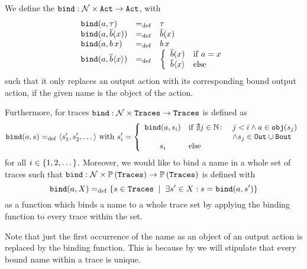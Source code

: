 \begin{definition}[Binding]
\label{def_binding}
	We define the  $\mathtt{bind}: \mathcal N\times\mathtt{Act} \rightarrow \mathtt{Act}$, with
	\begin{align*}
		\begin{array}{lcl}
			\mathtt{bind}(a,\tau) & =_{\mathrm{def}} & \tau \\
			\mathtt{bind}(a,\overline{b}(x)) & =_{\mathrm{def}} & \overline{b}(x) \\
			\mathtt{bind}(a,b\,x) & =_{\mathrm{def}} & b\,x \\
			\mathtt{bind}(a,\overline{b}\langle x\rangle) & =_{\mathrm{def}} & \left\{\begin{array}{ll}
									\overline{b}(x) & \mathrm{if}\; a=x \\
									\overline{b}\langle x\rangle & \text{else}
								\end{array} \right.
		\end{array}
	\end{align*}
	such that it only replaces an output action with its corresponding bound output action, if the given name is the object of the action.

Furthermore, for traces $\mathtt{bind}: \mathcal N\times\mathtt{Traces} \rightarrow \mathtt{Traces}$ is defined as
\begin{align*}
\mathtt{bind}(a,s) =_{\mathrm{def}} \langle s'_1,s'_2,\dots\rangle \text{ with }  s'_i =\left\{
								\begin{array}{cll}
									 \mathtt{bind}(a,s_i) & \text{if } \nexists{}j\in\mathbb N\colon{}&j<i \wedge a\in\mathtt{obj}(s_j) \\
													& & \wedge{}s_j\in\mathtt{Out}\cup\mathtt{Bout} \\
									s_i & \text{else}&
								\end{array}\right.
\end{align*}
for all $i\in\set{1,2,\dots}$. Moreover, we would like to bind a name in a whole set of traces such that $\mathtt{bind}: \mathcal N\times\mathbb P\left(\mathtt{Traces}\right) \rightarrow \mathbb P\left(\mathtt{Traces}\right)$ is defined with
\[\bind{a}{X} \define \set[\exists s'\in{}X: s=\bind{a}{s'}]{s\in\tr}\]
as a function which binds a name to a whole trace set by applying the binding function to every trace within the set.
\end{definition}

Note that just the first occurrence of the name as an object of an output action is replaced by the binding function. This is because by  we will stipulate that every bound name within a trace is unique.

